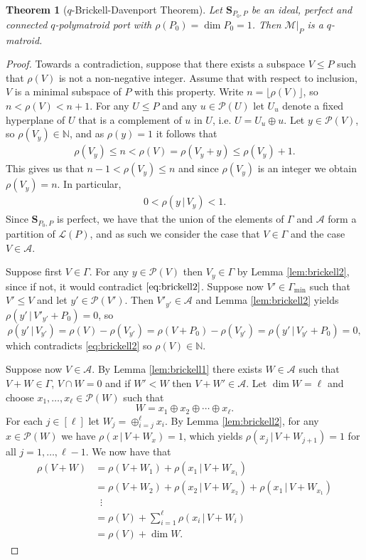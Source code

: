 \documentclass[onecolumn,draftclsnofoot,12pt]{IEEEtran}
\renewcommand{\L}{\mathcal{L}}
\newcommand{\A}{\mathcal{A}}
\renewcommand{\P}{\mathcal{P}}
\renewcommand{\S}{\mathbf{S}}
\newcommand{\M}{\mathcal{M}}
\theoremstyle{plain} %
\newtheorem{theorem}{Theorem}
\theoremstyle{definition}
\begin{document}
\begin{theorem}[$q$-Brickell-Davenport Theorem] Let $\S_{P_0,P}$ be an ideal, perfect and connected $q$-polymatroid port with $\rho(P_0) = \dim P_0 = 1$. Then $\M|_P$ is a $q$-matroid. \label{thm:brickelldavenport}
\end{theorem}
\begin{proof}
Towards a contradiction, suppose that there exists a subspace $V\leq P$ such that $\rho(V)$ is not a non-negative integer. Assume that with respect to inclusion, $V$ is a minimal subspace of $P$ with this property. Write $n= \lfloor \rho(V) \rfloor$, so $n < \rho(V) <n+1.$ For any $U\leq P$ and any $u\in \P(U)$ let $U_u$ denote a fixed hyperplane of $U$ that is a complement of $u$ in $U$, i.e. $U = U_u \oplus u$. Let $y\in \P(V)$, so $\rho(V_y)\in \mathbb{N}$, and as $\rho(y) = 1$ it follows that
\begin{align}
    \rho(V_y) \leq n <\rho(V) = \rho(V_y + y) \leq \rho(V_y) +1.\label{eq:brickell1}
\end{align}
This gives us that $n-1 <\rho(V_y) \leq n$ and since $\rho(V_y)$ is an integer we obtain $\rho(V_y) = n$. In particular,
\begin{align}
    0<\rho(y\,|\, V_y) <1. \label{eq:brickell2}
\end{align}
%
Since $\S_{P_0,P}$ is perfect, we have that the union of the elements of $\Gamma$ and $\A$ form a partition of $\L(P)$, and as such we consider the case that $V \in \Gamma$ and the case $V \in \A$.

Suppose first $V\in \Gamma$. For any $y\in \P(V)$ then $V_y\in \Gamma$ by Lemma \ref{lem:brickell2}, since if not, it would contradict $\eqref{eq:brickell2}$. Suppose now $V'\in \Gamma_{\min}$ such that $V'\leq V$ and let $y'\in \P(V')$. Then $V'_{y'}\in \A$ and Lemma \ref{lem:brickell2} yields $\rho(y'\,|\, V'_{y'}+P_0) = 0$, so
\[
    \rho(y'\,|\, V_{y'}) = \rho(V) - \rho(V_{y'}) = \rho(V+P_0) - \rho(V_{y'}) = \rho(y'\,|\, V_{y'}+P_0)=0,
\]
which contradicts \eqref{eq:brickell2} so $\rho(V)\in \mathbb{N}$.

Suppose now $V\in \A$. By Lemma \ref{lem:brickell1} there exists $W\in \A$ such that $V+W \in \Gamma$, $V\cap W = 0$ and if $W'<W$ then $V +W'\in \A$. Let $\dim W =\ell$ and choose $x_1,\dots,x_\ell \in \P(W)$ such that
\[
    W = x_1 \oplus x_2 \oplus \cdots \oplus x_\ell.
\]
For each $j\in [\ell]$ let $W_j = \oplus^\ell_{i=j}x_i$.  By Lemma \ref{lem:brickell2}, for any $x\in \P(W)$ we have $\rho(x\,|\, V+W_x) = 1$, which yields $\rho(x_j \,|\, V+W_{j+1})=1$ for all $j=1,\ldots,\ell-1$. We now have that
\begin{align*}
    \rho(V+W)   &= \rho(V+W_1)+\rho(x_1 \,|\, V+W_{x_1}) \\
                &= \rho(V+W_2) + \rho(x_2 \,|\, V+W_{x_2}) + \rho(x_1 \,|\, V+W_{x_1}) \\
                &\: \,\,\vdots \\
                &= \rho(V) + \sum^{\ell}_{i=1} \rho(x_i \,|\, V+W_i) \\
                &= \rho(V) + \dim W.
\end{align*}


\end{proof}
\end{document}
